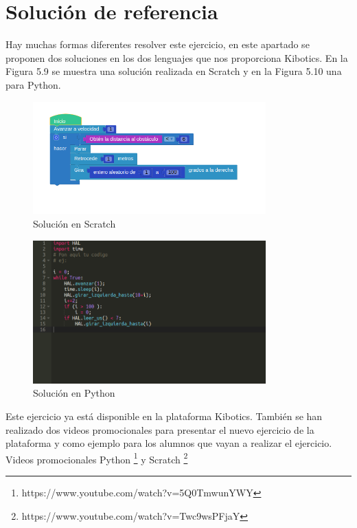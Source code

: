\section{Solución de referencia}

Hay muchas formas diferentes resolver este ejercicio, en este apartado se proponen dos soluciones en los dos lenguajes que nos proporciona Kibotics. En la Figura 5.9 se muestra una solución realizada en Scratch y en la Figura 5.10 una para Python.

\begin{figure}[H]
    \centering
    \includegraphics[width=0.8\textwidth, height=0.4\textwidth]{chapters/images/solucionroombascratch.png}
    \caption{Solución en Scratch }
    \label{fig:my_label}
\end{figure}
\begin{figure}[H]
    \centering
    \includegraphics[width=0.8\textwidth, height=0.4\textwidth]{chapters/images/solucionroombapython.png}
    \caption{Solución en Python}
    \label{fig:my_label}
\end{figure}


Este ejercicio ya está disponible en la plataforma Kibotics. También se han realizado dos videos promocionales para presentar el nuevo ejercicio de la plataforma y como ejemplo para  los alumnos que vayan a realizar el ejercicio. Videos promocionales Python  \footnote{https://www.youtube.com/watch?v=5Q0TmwunYWY} y Scratch \footnote{https://www.youtube.com/watch?v=Twc9wsPFjaY}